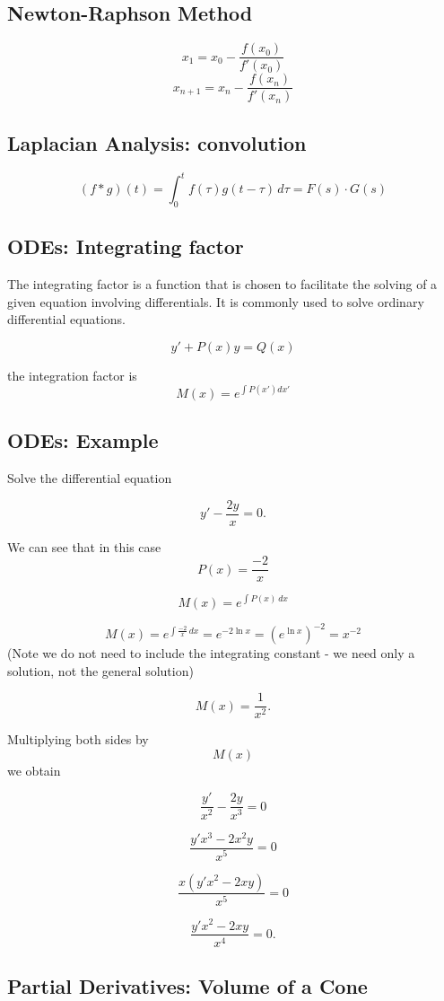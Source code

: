 \documentclass[12pt, a4paper]{article}
\begin{document}
\subsection*{Newton-Raphson Method}
\[x_{1} = x_0 - \frac{f(x_0)}{f'(x_0)}\]
\[x_{n+1} = x_n - \frac{f(x_n)}{f'(x_n)} \]

\subsection*{Laplacian Analysis: convolution}

\[ (f * g)(t) = \int_0^t f(\tau)g(t-\tau)\,d\tau= F(s) \cdot G(s) \]

\subsection{ODEs: Integrating factor}
The integrating factor is a function that is chosen to facilitate the solving of a given equation involving differentials. It is commonly used to solve ordinary differential equations.

\[ y'+ P(x)y = Q(x)\]

the integration factor is 
\[M(x) = e^{\int P(x') dx'}\]


\subsection*{ODEs: Example}

Solve the differential equation

\[y'-\frac{2y}{x} = 0.\]

We can see that in this case \[P(x) = \frac{-2}{x}\]

\[ M(x)=e^{\int P(x)\,dx}\]

\[ M(x)=e^{\int \frac{-2}{x}\,dx} = e^{-2 \ln x} = {(e^{\ln x})}^{-2} = x^{-2} \] (Note we do not need to include the integrating constant - we need only a solution, not the general solution)

\[ M(x)=\frac{1}{x^2}.\]

Multiplying both sides by \[M(x)\] we obtain

\[\frac{y'}{x^2} - \frac{2y}{x^3} = 0\]

\[\frac{y'x^3 - 2x^2y}{x^5} = 0\]

\[\frac{x(y'x^2 - 2xy)}{x^5} = 0\]

\[\frac{y'x^2 - 2xy}{x^4} = 0.\]


\subsection{Partial Derivatives: Volume of a Cone}
\end{document}
